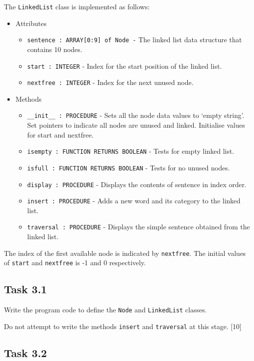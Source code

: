 The \texttt{LinkedList} class is implemented as follows: 
\begin{itemize}
\item Attributes
\begin{itemize}
\item \texttt{sentence : ARRAY{[}0:9{]} of Node -} The linked list data
structure that contains 10 nodes.
\item \texttt{start : INTEGER} - Index for the start position of the linked
list. 
\item \texttt{nextfree : INTEGER} - Index for the next unused node.
\end{itemize}
\item Methods
\begin{itemize}
\item \texttt{\_\_init\_\_ : PROCEDURE} - Sets all the node data values
to \textquoteleft empty string\textquoteright . Set pointers to indicate
all nodes are unused and linked. Initialise values for start and nextfree.
\item \texttt{isempty : FUNCTION RETURNS BOOLEAN} - Tests for empty linked
list.
\item \texttt{isfull : FUNCTION RETURNS BOOLEAN} - Tests for no unused nodes.
\item \texttt{display : PROCEDURE} - Displays the contents of sentence in
index order. 
\item \texttt{insert : PROCEDURE} - Adds a new word and its category to
the linked list. 
\item \texttt{traversal : PROCEDURE} - Displays the simple sentence obtained
from the linked list.
\end{itemize}
\end{itemize}
The index of the first available node is indicated by \texttt{nextfree}.
The initial values of \texttt{start} and \texttt{nextfree} is -1 and
0 respectively.

\subsection*{Task 3.1}

Write the program code to define the \texttt{Node} and \texttt{LinkedList}
classes. 

Do not attempt to write the methods \texttt{insert} and \texttt{traversal}
at this stage. \hfill{} {[}10{]}

\subsection*{Task 3.2}

